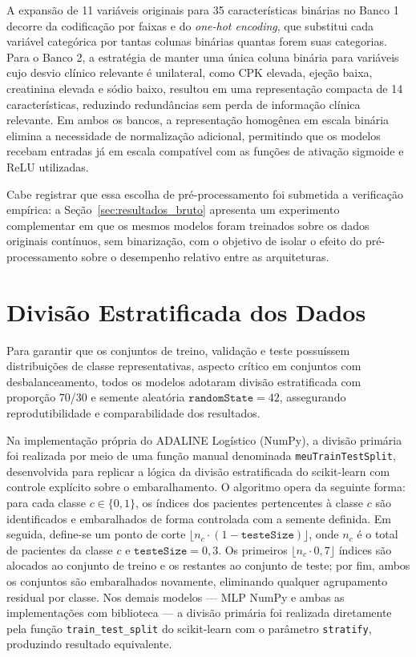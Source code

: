 A expansão de 11 variáveis originais para 35 características binárias no Banco 1 decorre da codificação por faixas e do \textit{one-hot encoding}, que substitui cada variável categórica por tantas colunas binárias quantas forem suas categorias. Para o Banco 2, a estratégia de manter uma única coluna binária para variáveis cujo desvio clínico relevante é unilateral, como CPK elevada, ejeção baixa, creatinina elevada e sódio baixo, resultou em uma representação compacta de 14 características, reduzindo redundâncias sem perda de informação clínica relevante. Em ambos os bancos, a representação homogênea em escala binária elimina a necessidade de normalização adicional, permitindo que os modelos recebam entradas já em escala compatível com as funções de ativação sigmoide e ReLU utilizadas.

Cabe registrar que essa escolha de pré-processamento foi submetida a verificação empírica: a Seção~\ref{sec:resultados_bruto} apresenta um experimento complementar em que os mesmos modelos foram treinados sobre os dados originais contínuos, sem binarização, com o objetivo de isolar o efeito do pré-processamento sobre o desempenho relativo entre as arquiteturas.

\section{Divisão Estratificada dos Dados}
\label{sec:divisao_dados}

Para garantir que os conjuntos de treino, validação e teste possuíssem distribuições de classe representativas, aspecto crítico em conjuntos com desbalanceamento, todos os modelos adotaram divisão estratificada com proporção 70/30 e semente aleatória $\texttt{randomState} = 42$, assegurando reprodutibilidade e comparabilidade dos resultados.

Na implementação própria do ADALINE Logístico (NumPy), a divisão primária foi realizada por meio de uma função manual denominada \texttt{meuTrainTestSplit}, desenvolvida para replicar a lógica da divisão estratificada do scikit-learn com controle explícito sobre o embaralhamento. O algoritmo opera da seguinte forma: para cada classe $c \in \{0, 1\}$, os índices dos pacientes pertencentes à classe $c$ são identificados e embaralhados de forma controlada com a semente definida. Em seguida, define-se um ponto de corte $\lfloor n_c \cdot (1 - \texttt{testeSize}) \rfloor$, onde $n_c$ é o total de pacientes da classe $c$ e $\texttt{testeSize} = 0{,}3$. Os primeiros $\lfloor n_c \cdot 0{,}7 \rfloor$ índices são alocados ao conjunto de treino e os restantes ao conjunto de teste; por fim, ambos os conjuntos são embaralhados novamente, eliminando qualquer agrupamento residual por classe. Nos demais modelos --- MLP NumPy e ambas as implementações com biblioteca --- a divisão primária foi realizada diretamente pela função \texttt{train\_test\_split} do scikit-learn com o parâmetro \texttt{stratify}, produzindo resultado equivalente.

